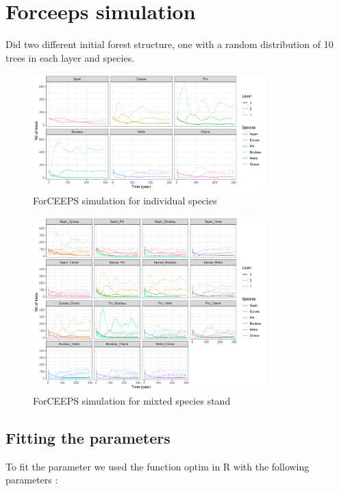 \documentclass{article}
\begin{document}
\section{Forceeps simulation}

Did two different initial forest structure, one with a random distribution of 10 trees in each layer and species.

\begin{figure}[H]
    \centering
    \includegraphics[width=0.8\textwidth]{Figure/forceps_simul_unique.png}
    \caption{ForCEEPS simulation for individual species}
    \label{fig:my_label}
\end{figure}

\begin{figure}[H]
    \centering
    \includegraphics[width=0.8\textwidth]{Figure/forceps_simul_multi.png}
    \caption{ForCEEPS simulation for mixted species stand}
    \label{fig:my_label}
\end{figure}

\subsection{Fitting the parameters}

To fit the parameter we used the function optim in R with the following parameters :
\end{document}
